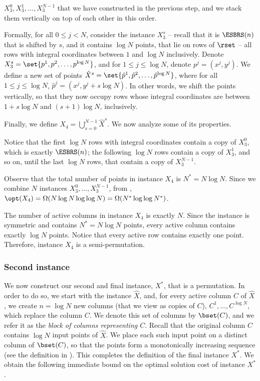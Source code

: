 $X^0_3,X^1_3,\ldots,X^{N-1}_3$ that we have constructed in the previous step, and we stack them vertically on top of each other in this order. 

Formally, for all $0\leq j< N$, consider the instance $X^s_3$ -- recall that it is $\ESBRS(n)$ that is shifted by $s$, and it contains $\log N$ points, that lie on rows of $\rset$ -- all rows with integral coordinates between $1$ and $\log N$ inclusively.
Denote $X^s_3=\set{p^1,p^2,\ldots,p^{\log N}}$, and for $1\leq j\leq \log N$, denote $p^j=(x^j,y^j)$. We define a new set of points $\hat X^s=\set{\hat p^1,\hat p^2,\ldots,\hat p^{\log N}}$, where for all $1\leq j\leq \log N$, $\hat p^j=(x^j,y^j+s\log N)$. In other words, we shift the points vertically, so that they now occupy rows whose integral coordinates are between $1+s\log N$ and $(s+1)\log N$, inclusively.

Finally, we define $X_4=\bigcup_{s=0}^{N-1}\hat X^s$. We now analyze some of its properties.

Notice that the first $\log N$ rows with integral coordinates contain a copy of $X^0_3$, which is exactly $\ESBRS(n)$; the following $\log N$ rows contain a copy of $X^1_3$, and so on, until the last $\log N$ rows, that contain a copy of $X^{N-1}_3$.

Observe that the total number of points in instance $X_4$ is $N^*=N\log N$. Since we combine $N$ instances $X^0_3,\ldots,X^{N-1}_3$, from , $\opt(X_4)=\Omega(N\log N\log\log N)=\Omega(N^*\log\log N^*)$. 

The number of active columns in instance $X_4$ is exactly $N$. Since the instance is symmetric and contains $N^*=N\log N$ points, every active column contains exactly $\log N$ points. Notice that every active row contains exactly one point. Therefore, instance $X_4$ is a semi-permutation.
\fi 



%
%
%
%
%
%
%
\subsubsection{Second instance}


We now construct our second and final instance, $X^*$, that is a permutation. 
In order to do so, we start with the instance $\hat{X}$, and, for every active column $C$ of $\hat{X}$, we create $n= \log N$ new columns (that we view as copies of $C$), $C^1,\ldots,C^{\log N}$, which replace the column $C$. 
We denote this set of columns by $\bset(C)$, and we refer it as the \emph{block of columns representing $C$}. 
Recall that the original column $C$ contains $\log N$ input points of $\hat{X}$. 
We place each such input point on a distinct column of $\bset(C)$, so that the points form a monotonically increasing sequence (see the definition in ). This completes the definition of the final instance $X^*$.
%
We obtain the following immediate bound on the optimal solution cost of instance $X^*$.


